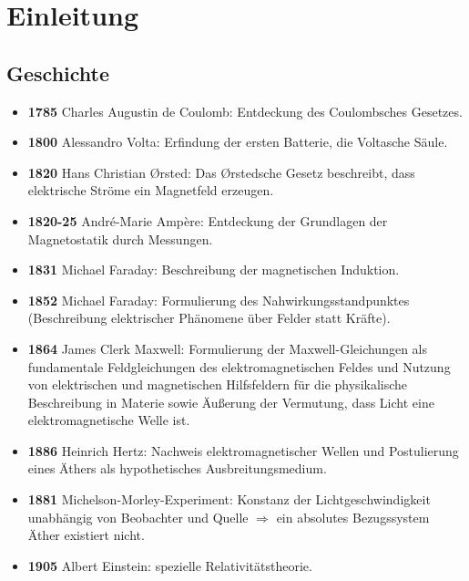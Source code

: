 
\chapter{Einleitung\label{einleitung}}

\section{Geschichte}

\begin{itemize}
	\item \textbf{1785} \textendash{} Charles Augustin de Coulomb: Entdeckung des Coulombsches Gesetzes.

	\item \textbf{1800} \textendash{} Alessandro Volta: Erfindung der ersten Batterie, die Voltasche Säule.

	\item \textbf{1820} \textendash{}  Hans Christian \O{}rsted: Das \O{}rstedsche Gesetz beschreibt, dass elektrische Ströme ein Magnetfeld erzeugen.

	\item \textbf{1820-25} \textendash{}   André-Marie Ampère: Entdeckung der Grundlagen der Magnetostatik durch Messungen.

	\item \textbf{1831} \textendash{}  Michael Faraday: Beschreibung der magnetischen Induktion.

	\item \textbf{1852} \textendash{}  Michael Faraday: Formulierung des Nahwirkungsstandpunktes (Beschreibung elektrischer Phänomene über Felder statt Kräfte).

	\item \textbf{1864} \textendash{} James Clerk Maxwell: Formulierung der Maxwell-Gleichungen als fundamentale Feldgleichungen des elektromagnetischen Feldes und Nutzung von elektrischen und magnetischen Hilfsfeldern für die physikalische Beschreibung in Materie sowie Äußerung der Vermutung, dass Licht eine elektromagnetische Welle ist.

	\item \textbf{1886} \textendash{} Heinrich Hertz: Nachweis elektromagnetischer Wellen und Postulierung eines Äthers als hypothetisches Ausbreitungsmedium.

	\item \textbf{1881} \textendash{} Michelson-Morley-Experiment: Konstanz der Lichtgeschwindigkeit unabhängig von Beobachter und Quelle ${\Rightarrow}$ ein absolutes Bezugssystem Äther existiert nicht.

	\item \textbf{1905} \textendash{} Albert Einstein: spezielle Relativitätstheorie.

\end{itemize}





